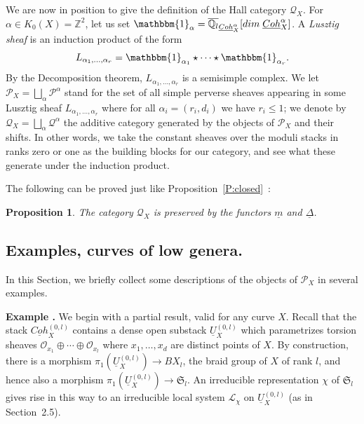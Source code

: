 \documentclass[a4paper,10pt]{amsart}
\def\Z{\mathbb{Z}}
\def\a{\alpha}
\def\qlb{\overline{\mathbb{Q}_l}}
\newtheorem{prop}[theo]{Proposition}
\numberwithin{equation}{section}
\begin{document}
\vspace{.2in}

We are now in position to give the definition of the Hall category $\mathcal{Q}_X$. For $\a \in K_0(X) =\Z^2$, let us set
$\mathbbm{1}_{\a}=\qlb_{\underline{Coh}^{\a}_X}[dim\;  \underline{Coh}^{\a}_X]$. A \textit{Lusztig sheaf} is an induction product of the form
$$L_{\a_1, \ldots, \a_r} = \mathbbm{1}_{\a_1} \star \cdots \star \mathbbm{1}_{\a_r}.$$
By the Decomposition theorem, $L_{\a_1, \ldots, \a_r}$ is a semisimple complex. We let $\mathcal{P}_X=\bigsqcup_{\a} \mathcal{P}^{\a}$ stand for the set of all simple perverse sheaves appearing in some Lusztig sheaf $L_{\a_1, \ldots, \a_r}$ where for all $\a_i=(r_i,d_i)$ we have $r_i \leq 1$; we denote by $\mathcal{Q}_X=\bigsqcup_{\a} \mathcal{Q}^{\alpha}$ the additive category generated by the objects of $\mathcal{P}_X$ and their shifts. 
In other words, we take the constant sheaves over the moduli stacks in ranks zero or one as the building blocks for our category, and see what these generate under the induction product.

\vspace{.1in}

The following can be proved just like Proposition~\ref{P:closed}~:

\begin{prop}The category $\mathcal{Q}_X$ is preserved by the functors $\underline{m}$ and $\underline{\Delta}$.
\end{prop}

\vspace{.3in}

\subsection{Examples, curves of low genera.}

\vspace{.15in}

In this Section, we briefly collect  some descriptions of the objects of $\mathcal{P}_X$ in several examples. 

\vspace{.2in}

\addtocounter{theo}{1}
\noindent \textbf{Example \thetheo .} We begin with a partial result, valid for any curve $X$. Recall that the stack $\underline{Coh}^{(0,l)}_X$ contains a dense open substack $\underline{U}_X^{(0,l)}$ which parametrizes torsion sheaves $\mathcal{O}_{x_1} \oplus \cdots \oplus \mathcal{O}_{x_l}$ where $x_1, \ldots, x_d$ are distinct points of $X$. By construction, there is a morphism $\pi_1( \underline{U}_X^{(0,l)})\to BX_l$, the braid group of $X$ of rank $l$, and hence also a morphism
$\pi_1( \underline{U}_X^{(0,l)})\to \mathfrak{S}_l$. An irreducible representation $\chi$ of $\mathfrak{S}_l$
gives rise in this way to an irreducible local system $\mathcal{L}_{\chi}$ on $\underline{U}_X^{(0,l)}$ (as in Section~2.5).
\end{document}
